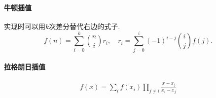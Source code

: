 \paragraph{牛顿插值} 
实现时可以用$k$次差分替代右边的式子.
$$ f(n)=\sum_{i=0}^{k}{n\choose i}r_i,\quad r_i=\sum_{j=0}^i(-1)^{i-j}{i\choose j}f(j).$$
\paragraph{拉格朗日插值}
$$\begin{aligned}f(x) = \sum_i f(x_i)\prod_{j\ne i}\frac{x-x_j}{x_i-x_j}\end{aligned}$$